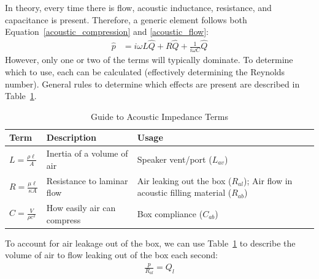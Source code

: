 \documentclass[10pt]{book}
\begin{document}
In theory, every time there is flow, acoustic inductance, resistance, and capacitance is present. Therefore, a generic element follows both Equation~\ref{acoustic_compression} and \ref{acoustic_flow}:
\begin{align}
\hat{p}&=i\omega L \hat{Q}+R \hat{Q} +\frac{1}{i\omega C}\hat{Q}
\end{align}
However, only one or two of the terms will typically dominate. To determine which to use, each can be calculated (effectively determining the Reynolds number). General rules to determine which effects are present are described in Table~\ref{table:acoustic}.


\begin{table}
\centering
\renewcommand{\arraystretch}{1.5}
\begin{tabularx}{\textwidth}{@{} l X X @{}}
\toprule
Term & Description & Usage \\
\midrule
$L = \frac{\rho \ell}{A}$ & Inertia of a volume of air & Speaker vent/port ($L_{av}$)  \\ 
$R = \frac{\mu \ell }{\kappa A}$ & Resistance to laminar flow &
Air leaking out the box ($R_{al}$); Air flow in acoustic filling material ($R_{ab}$)\\
$C = \frac{V}{\rho c^2}$ & How easily air can compress & Box compliance ($C_{ab}$)\\
\bottomrule
\end{tabularx}
\caption{Guide to Acoustic Impedance Terms}\label{table:acoustic}
\end{table}

To account for air leakage out of the box, we can use Table~\ref{table:acoustic} to describe the volume of air to flow leaking out of the box each second:
\begin{align}
\frac{p}{R_{al}} = Q_l
\end{align}
\end{document}
